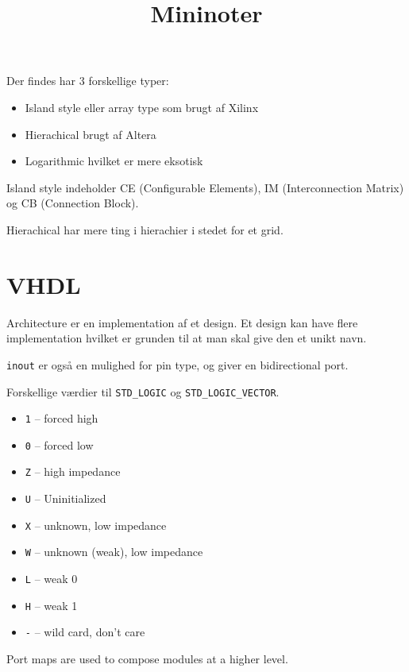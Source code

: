 \title{Mininoter}

Der findes har 3 forskellige typer:
\begin{itemize}
    \item Island style eller array type som brugt af Xilinx
    \item Hierachical brugt af Altera
    \item Logarithmic hvilket er mere eksotisk
\end{itemize}

Island style indeholder CE (Configurable Elements), IM (Interconnection Matrix) og CB (Connection Block).

Hierachical har mere ting i hierachier i stedet for et grid.

\section{VHDL}

Architecture er en implementation af et design.
Et design kan have flere implementation hvilket er grunden til at man skal give den et unikt navn.

\texttt{inout} er også en mulighed for pin type, og giver en bidirectional port.

Forskellige værdier til \texttt{STD_LOGIC} og \texttt{STD_LOGIC_VECTOR}.

\begin{itemize}
    \item \texttt{1} -- forced high
    \item \texttt{0} -- forced low
    \item \texttt{Z} -- high impedance
    \item \texttt{U} -- Uninitialized
    \item \texttt{X} -- unknown, low impedance
    \item \texttt{W} -- unknown (weak), low impedance
    \item \texttt{L} -- weak 0
    \item \texttt{H} -- weak 1
    \item \texttt{-} -- wild card, don't care
\end{itemize}

Port maps are used to compose modules at a higher level.
